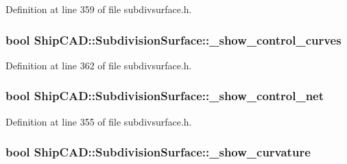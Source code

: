 Definition at line 359 of file subdivsurface.\-h.

\hypertarget{classShipCAD_1_1SubdivisionSurface_ae240b2177e0af0bd1512c94b524f22dd}{
\subsubsection[{\-\_\-show\-\_\-control\-\_\-curves}]{\setlength{\rightskip}{0pt plus 5cm}bool Ship\-C\-A\-D\-::\-Subdivision\-Surface\-::\-\_\-show\-\_\-control\-\_\-curves\hspace{0.3cm}{\ttfamily [protected]}}}\label{classShipCAD_1_1SubdivisionSurface_ae240b2177e0af0bd1512c94b524f22dd}


Definition at line 362 of file subdivsurface.\-h.

\hypertarget{classShipCAD_1_1SubdivisionSurface_ab9bb374cf1368b4a2c779f953bca88a8}{
\subsubsection[{\-\_\-show\-\_\-control\-\_\-net}]{\setlength{\rightskip}{0pt plus 5cm}bool Ship\-C\-A\-D\-::\-Subdivision\-Surface\-::\-\_\-show\-\_\-control\-\_\-net\hspace{0.3cm}{\ttfamily [protected]}}}\label{classShipCAD_1_1SubdivisionSurface_ab9bb374cf1368b4a2c779f953bca88a8}


Definition at line 355 of file subdivsurface.\-h.

\hypertarget{classShipCAD_1_1SubdivisionSurface_abe2167085eac50c986b074635b610462}{
\subsubsection[{\-\_\-show\-\_\-curvature}]{\setlength{\rightskip}{0pt plus 5cm}bool Ship\-C\-A\-D\-::\-Subdivision\-Surface\-::\-\_\-show\-\_\-curvature\hspace{0.3cm}{\ttfamily [protected]}}}\label{classShipCAD_1_1SubdivisionSurface_abe2167085eac50c986b074635b610462}



